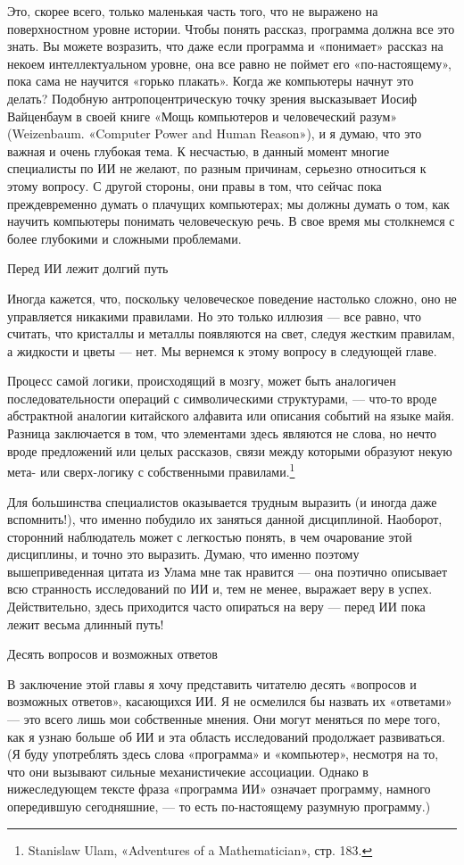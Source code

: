 \documentclass[../main.tex]{subfiles}
\begin{document}
Это, скорее всего, только маленькая часть того, что не выражено на поверхностном уровне истории. Чтобы понять рассказ, программа должна все это знать. Вы можете возразить, что даже если программа и «понимает» рассказ на некоем интеллектуальном уровне, она все равно не поймет его «по-настоящему», пока сама не научится «горько плакать». Когда же компьютеры начнут это делать? Подобную антропоцентрическую точку зрения высказывает Иосиф Вайценбаум в своей книге «Мощь компьютеров и человеческий разум» (Weizenbaum. «Computer Power and Human Reason»), и я думаю, что это важная и очень глубокая тема. К несчастью, в данный момент многие специалисты по ИИ не желают, по разным причинам, серьезно относиться к этому вопросу. С другой стороны, они правы в том, что сейчас пока преждевременно думать о плачущих компьютерах; мы должны думать о том, как научить компьютеры понимать человеческую речь. В свое время мы столкнемся с более глубокими и сложными проблемами.

Перед ИИ лежит долгий путь

Иногда кажется, что, поскольку человеческое поведение настолько сложно, оно не управляется никакими правилами. Но это только иллюзия --- все равно, что считать, что кристаллы и металлы появляются на свет, следуя жестким правилам, а жидкости и цветы --- нет. Мы вернемся к этому вопросу в следующей главе.

Процесс самой логики, происходящий в мозгу, может быть аналогичен последовательности операций с символическими структурами, --- что-то вроде абстрактной аналогии китайского алфавита или описания событий на языке майя. Разница заключается в том, что элементами здесь являются не слова, но нечто вроде предложений или целых рассказов, связи между которыми образуют некую мета- или сверх-логику с собственными правилами.\footnote{Stanislaw Ulam, «Adventures of a Mathematician», стр. 183.}

Для большинства специалистов оказывается трудным выразить (и иногда даже вспомнить!), что именно побудило их заняться данной дисциплиной. Наоборот, сторонний наблюдатель может с легкостью понять, в чем очарование этой дисциплины, и точно это выразить. Думаю, что именно поэтому вышеприведенная цитата из Улама мне так нравится --- она поэтично описывает всю странность исследований по ИИ и, тем не менее, выражает веру в успех. Действительно, здесь приходится часто опираться на веру --- перед ИИ пока лежит весьма длинный путь!

Десять вопросов и возможных ответов

В заключение этой главы я хочу представить читателю десять «вопросов и возможных ответов», касающихся ИИ. Я не осмелился бы назвать их «ответами» --- это всего лишь мои собственные мнения. Они могут меняться по мере того, как я узнаю больше об ИИ и эта область исследований продолжает развиваться. (Я буду употреблять здесь слова «программа» и «компьютер», несмотря на то, что они вызывают сильные механистичекие ассоциации. Однако в нижеследующем тексте фраза «программа ИИ» означает программу, намного опередившую сегодняшние, --- то есть по-настоящему разумную программу.)
\end{document}
